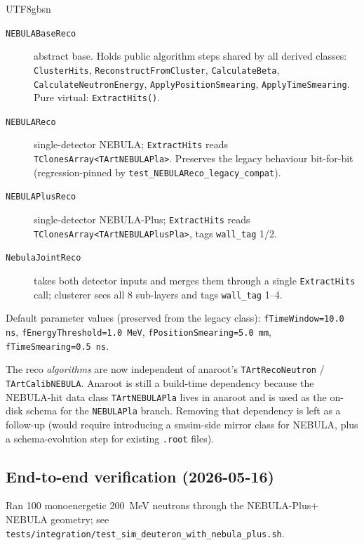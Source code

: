 \documentclass[11pt,a4paper]{article}
\newcommand{\NEB}{NEBULA}
\newcommand{\NPL}{NEBULA-Plus}
\begin{document}
\begin{CJK}{UTF8}{gbsn}
\begin{description}
  \item[\texttt{NEBULABaseReco}] abstract base. Holds public algorithm
        steps shared by all derived classes:
        \texttt{ClusterHits},
        \texttt{ReconstructFromCluster},
        \texttt{CalculateBeta},
        \texttt{CalculateNeutronEnergy},
        \texttt{ApplyPositionSmearing},
        \texttt{ApplyTimeSmearing}.
        Pure virtual: \texttt{ExtractHits()}.
  \item[\texttt{NEBULAReco}] single-detector \NEB{}; \texttt{ExtractHits}
        reads \texttt{TClonesArray<TArtNEBULAPla>}. Preserves the legacy
        behaviour bit-for-bit (regression-pinned by
        \texttt{test\_NEBULAReco\_legacy\_compat}).
  \item[\texttt{NEBULAPlusReco}] single-detector \NPL{}; \texttt{ExtractHits}
        reads \texttt{TClonesArray<TArtNEBULAPlusPla>}, tags
        \texttt{wall\_tag} 1/2.
  \item[\texttt{NebulaJointReco}] takes both detector inputs and merges
        them through a single \texttt{ExtractHits} call; cluster\-er sees
        all 8 sub-layers and tags \texttt{wall\_tag} 1--4.
\end{description}

Default parameter values (preserved from the legacy class):
\texttt{fTimeWindow=10.0\,ns}, \texttt{fEnergyThreshold=1.0\,MeV},
\texttt{fPositionSmearing=5.0\,mm}, \texttt{fTimeSmearing=0.5\,ns}.

The reco \emph{algorithms} are now independent of anaroot's
\texttt{TArtRecoNeutron} / \texttt{TArtCalibNEBULA}. Anaroot is still a
build-time dependency because the \NEB{}-hit data class
\texttt{TArtNEBULAPla} lives in anaroot and is used as the on-disk schema
for the \texttt{NEBULAPla} branch. Removing that dependency is left as a
follow-up (would require introducing a smsim-side mirror class for
\NEB{}, plus a schema-evolution step for existing \texttt{.root} files).

\subsection{End-to-end verification (2026-05-16)}

Ran 100 monoenergetic \SI{200}{MeV} neutrons through the
\NPL{}$+$\NEB{} geometry; see \texttt{tests/integration/test\_sim\_deuteron\_with\_nebula\_plus.sh}.


\end{CJK}
\end{document}
